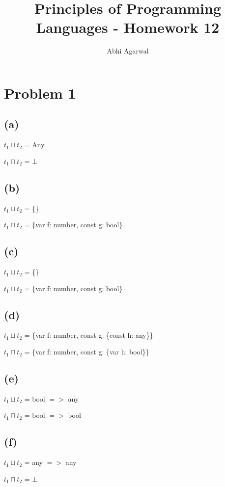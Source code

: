 \documentclass[11pt, oneside]{article}
\title{Principles of Programming Languages - Homework 12}
\author{Abhi Agarwal}
\date{}
\begin{document}
\maketitle
\section{Problem 1}
\subsection*{(a)} 
\indent \par $t_1 \sqcup t_2$ = Any
\par $t_1 \sqcap t_2$ = $\bot$

\subsection*{(b)}
\indent \par $t_1 \sqcup t_2$ = \{\}
\par $t_1 \sqcap t_2$ = \{var f: number, const g: bool\}

\subsection*{(c)}
\indent \par $t_1 \sqcup t_2$ = \{\}
\par $t_1 \sqcap t_2$ = \{var f: number, const g: bool\}

\subsection*{(d)}
\indent \par $t_1 \sqcup t_2$ = \{var f: number, const g: \{const h: any\}\}
\par $t_1 \sqcap t_2$ = \{var f: number, const g: \{var h: bool\}\}

\subsection*{(e)}
\indent \par $t_1 \sqcup t_2$ = bool $=>$ any
\par $t_1 \sqcap t_2$ = bool $=>$ bool

\subsection*{(f)}
\indent \par $t_1 \sqcup t_2$ = any $=>$ any
\par $t_1 \sqcap t_2$ =  $\bot$ %
\end{document}
